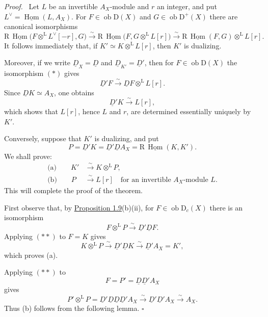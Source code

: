 \documentclass[11pt]{article}
\providecommand{\qedtext}{\hfill$\square$}
\newenvironment{prooftext}[1][Proof]{\par\noindent\emph{#1.}\ }{\par\medskip}
\DeclareMathOperator{\Hom}{Hom}
\newcommand{\R}{\mathrm{R}}
\newcommand{\D}{\mathrm{D}}
\newcommand{\ob}{\operatorname{ob}}
\providecommand{\Hom}{\operatorname{Hom}}
\providecommand{\ob}{\operatorname{ob}}
\providecommand{\R}{\mathrm R}
\providecommand{\Hom}{\operatorname{Hom}}
\providecommand{\qedtext}{\hfill$\square$}
\begin{document}
\begin{prooftext}
Let $L$ be an invertible $A_X$-module and $r$ an integer, and put $L^\vee=\underline{\Hom}(L,A_X)$. For $F\in\ob\D(X)$ and $G\in\ob\D^+(X)$ there are canonical isomorphisms
\begin{equation}
\R\,\underline{\Hom}\bigl(F\otimes^{\mathrm L}L^\vee[-r],G\bigr)
   \xrightarrow{\sim}
\R\,\underline{\Hom}\bigl(F,G\otimes^{\mathrm L}L[r]\bigr)
   \xrightarrow{\sim}
\R\,\underline{\Hom}(F,G)\otimes^{\mathrm L}L[r]. \tag{*}\label{sga5:I:equation:unnumbered}
\end{equation}
It follows immediately that, if $K'\simeq K\otimes^{\mathrm L}L[r]$, then $K'$ is dualizing.

Moreover, if we write $\underline D_X=\underline D$ and $\underline D_{K'}=\underline D'$, then for $F\in\ob\D(X)$ the isomorphism $(*)$ gives
\[
   \underline D'F\xrightarrow{\sim}\underline DF\otimes^{\mathrm L}L[r].
\]
Since $\underline DK\simeq A_X$, one obtains
\[
   \underline D'K\xrightarrow{\sim}L[r],
\]
which shows that $L[r]$, hence $L$ and $r$, are determined essentially uniquely by $K'$.

Conversely, suppose that $K'$ is dualizing, and put
\[
   P=\underline D'K=\underline D'\underline DA_X=\R\,\underline{\Hom}(K,K').
\]
We shall prove:
\begin{align*}
\text{(a)}\qquad K'&\xrightarrow{\sim}K\otimes^{\mathrm L}P,\\
\text{(b)}\qquad P&\xrightarrow{\sim}L[r]\quad\text{for an invertible }A_X\text{-module }L.
\end{align*}
This will complete the proof of the theorem.

First observe that, by \hyperref[sga5:I:lemma:1.9]{Proposition 1.9}(b)(ii), for $F\in\ob\D_c(X)$ there is an isomorphism
\begin{equation}
F\otimes^{\mathrm L}P\xrightarrow{\sim}\underline D'\underline DF. \tag{**}\label{sga5:I:equation:unnumbered:2}
\end{equation}
Applying $(**)$ to $F=K$ gives
\[
   K\otimes^{\mathrm L}P\xrightarrow{\sim}\underline D'\underline DK\xrightarrow{\sim}\underline D'A_X=K',
\]
which proves (a).

Applying $(**)$ to
\[
   F=P'=\underline D\underline D'A_X
\]
gives
\[
   P'\otimes^{\mathrm L}P
      =\underline D'\underline D\underline D\underline D'A_X
      \xrightarrow{\sim}\underline D'\underline D'A_X
      \xrightarrow{\sim}A_X.
\]
Thus (b) follows from the following lemma. \qedtext
\end{prooftext}
\end{document}
